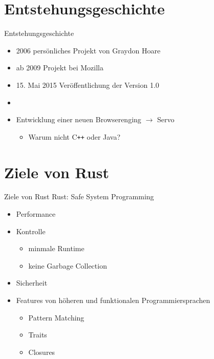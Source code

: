 \documentclass{beamer}
\begin{document}
\section{Entstehungsgeschichte}

\begin{frame}{Entstehungsgeschichte}
	\begin{itemize}
	  \item 2006 persönliches Projekt von Graydon Hoare
	  \item ab 2009 Projekt bei Mozilla
	  \item 15. Mai 2015 Veröffentlichung der Version 1.0
	  \pause
	  \item[]
	  \item Entwicklung einer neuen Browserenging $\rightarrow$ Servo
	  \pause
	  \begin{itemize}
		\item Warum nicht C\texttt{++} oder Java?
	  \end{itemize}
	 \end{itemize}	 
\end{frame}

\section{Ziele von Rust}
\begin{frame}{Ziele von Rust}
Rust: Safe System Programming
	  \begin{itemize}
	  	  \pause
	      \item Performance
	      \pause
	      \item Kontrolle 
	      \begin{itemize}
	          \item minmale Runtime
	          \item keine Garbage Collection
	      \end{itemize}
	      \pause
	      \item Sicherheit      
	      \pause
	      \item Features von höheren und funktionalen Programmiersprachen
	      \begin{itemize}
	        \item Pattern Matching
	        \item Traits
	        \item Closures
	      \end{itemize}
	  \end{itemize}
\end{frame}
\end{document}
